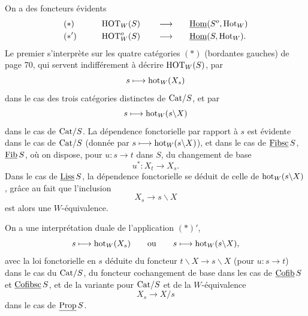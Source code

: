 \quad On a des foncteurs évidents
\[
\begin{aligned}
&(*) &\qquad& \mathrm{HOT}_W(S) &\quad& \longrightarrow &\quad& \underline{\mathrm{Hom}}(S^o,\mathrm{Hot}_W)\\
&(*') && \mathrm{HOT}^o_W(S) && \longrightarrow && \underline{\mathrm{Hom}}(S,\mathrm{Hot}_W).
\end{aligned}
\]
Le premier s'interprète sur les quatre catégories $(*)$ (bordantes gauches) de page 70, qui servent indifférement à décrire $\mathrm{HOT}_W(S)$, par %
\[ s\longmapsto\mathrm{hot}_W(X_s) \]
dans le cas des trois catégories distinctes de $\mathrm{Cat}/S$, et par
\[ s\longmapsto\mathrm{hot}_W(s\backslash X) \]
dans le cas de $\mathrm{Cat}/S$. La dépendence fonctorielle par rapport à $s$ est évidente dans le cas %
de $\mathrm{Cat}/S$ (donnée par $s\longmapsto\mathrm{hot}_W(s\backslash X)$), et dans le cas de $\underline{\mathrm{Fibsc}}\,S$, $\underline{\mathrm{Fib}}\,S$, où on dispose, pour $u : s\longrightarrow t$ dans $S$, du changement de base
\[ u^* : X_t\longrightarrow X_s. \]
Dans le cas de $\underline{\mathrm{Liss}}\,S$, la dépendence fonctorielle se déduit de celle de $\mathrm{hot}_W(s\backslash X)$, grâce %
au fait que l'inclusion
\[ X_s\longrightarrow s\backslash X \]
est alors une $W$-équivalence.

On a une interprétation duale de l'application
$(*)'$,
\[ s\longmapsto\mathrm{hot}_W(X_s)\qquad\text{ou}\qquad s\longmapsto\mathrm{hot}_W(s\backslash X), \]
avec la loi fonctorielle en $s$ déduite du foncteur $t\backslash X\longrightarrow s\backslash X$ (pour $u : s\longrightarrow t$) dans le cas du $\mathrm{Cat}/S$, du foncteur cochangement de base dans les cas de $\underline{\mathrm{Cofib}}\,S$ et $\underline{\mathrm{Cofibsc}}\,S$, et de la variante pour $\mathrm{Cat}/S$ et de la $W$-équivalence
\[ X_s\longrightarrow X/s \]
dans le cas de $\underline{\mathrm{Prop}}\,S$.

